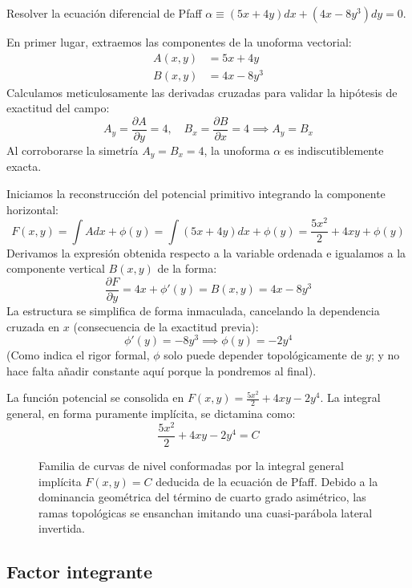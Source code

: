 \begin{ejercicio}
Resolver la ecuación diferencial de Pfaff $\alpha \equiv (5x + 4y)dx + (4x - 8y^3)dy = 0$.
\end{ejercicio}

\begin{tcolorbox}
En primer lugar, extraemos las componentes de la unoforma vectorial:
\begin{align*}
    A(x,y) &= 5x + 4y \\
    B(x,y) &= 4x - 8y^3 
\end{align*}
Calculamos meticulosamente las derivadas cruzadas para validar la hipótesis de exactitud del campo:
$$ A_y = \frac{\partial A}{\partial y} = 4, \quad B_x = \frac{\partial B}{\partial x} = 4 \implies A_y = B_x $$
Al corroborarse la simetría $A_y = B_x = 4$, la unoforma $\alpha$ es indiscutiblemente exacta.

Iniciamos la reconstrucción del potencial primitivo integrando la componente horizontal:
$$ F(x,y) = \int A dx + \phi(y) = \int (5x + 4y)dx + \phi(y) = \frac{5x^2}{2} + 4xy + \phi(y) $$
Derivamos la expresión obtenida respecto a la variable ordenada e igualamos a la componente vertical $B(x,y)$ de la forma:
$$ \frac{\partial F}{\partial y} = 4x + \phi'(y) = B(x,y) = 4x - 8y^3 $$
La estructura se simplifica de forma inmaculada, cancelando la dependencia cruzada en $x$ (consecuencia de la exactitud previa):
$$ \phi'(y) = -8y^3 \implies \phi(y) = -2y^4 $$
(Como indica el rigor formal, $\phi$ solo puede depender topológicamente de $y$; y no hace falta añadir constante aquí porque la pondremos al final).

La función potencial se consolida en $F(x,y) = \frac{5x^2}{2} + 4xy - 2y^4$.
La integral general, en forma puramente implícita, se dictamina como:
$$ \frac{5x^2}{2} + 4xy - 2y^4 = C $$

\begin{figure}[H]
    \centering
    
    \caption{Familia de curvas de nivel conformadas por la integral general implícita $F(x,y) = C$ deducida de la ecuación de Pfaff. Debido a la dominancia geométrica del término de cuarto grado asimétrico, las ramas topológicas se ensanchan imitando una cuasi-parábola lateral invertida.}
\end{figure}
\end{tcolorbox}

\subsection{Factor integrante}

